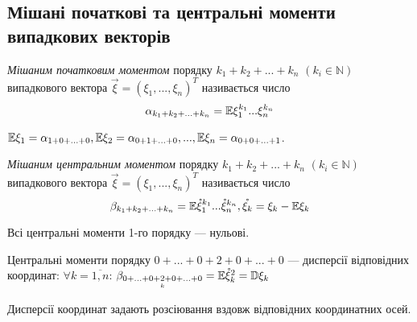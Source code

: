 \subsection{Мішані початкові та центральні 
            моменти випадкових векторів}
\begin{definition}
    \emph{Мішаним початковим моментом} порядку 
    $k_1+k_2+...+k_n$ 
    $\left(k_i \in \mathbb{N}\right)$
    випадкового вектора 
    $\vec{\xi} = \left(\xi_1, ..., \xi_n\right)^T$
    називається число
    \begin{equation*}
        \alpha_{k_1+k_2+...+k_n} = 
        \mathbb{E}{\xi_1^{k_1}...\xi_n^{k_n}}
    \end{equation*}
\end{definition}
\begin{remark}
    $\mathbb{E}\xi_1 = \alpha_{1+0+...+0}, \mathbb{E}\xi_2 = \alpha_{0+1+...+0},
    ..., \mathbb{E}\xi_n = \alpha_{0+0+...+1}$.
\end{remark}
\begin{definition}
    \emph{Мішаним центральним моментом} порядку 
    $k_1+k_2+...+k_n$
    $\left(k_i \in \mathbb{N}\right)$ 
    випадкового вектора
    $\vec{\xi} = \left(\xi_1, ..., \xi_n\right)^T$
    називається число
    \begin{equation*}
        \beta_{k_1+k_2+...+k_n} = 
        \mathbb{E}{\mathring{\xi}_1^{k_1}
        ...
        \mathring{\xi}_n^{k_n}},
        \mathring{\xi_k} = \xi_k - \mathbb{E}\xi_k
    \end{equation*}
\end{definition}
\begin{remark}
    Всі центральні моменти 1-го порядку --- 
    нульові.
\end{remark}
Центральні моменти порядку $0+...+0+2+0+...+0$ --- дисперсії відповідних координат:
    $\forall k = \overline{1,n}$: 
    $\beta_{0+...+0+\underset{k}{2}
    +0+...+0} = \mathbb{E}\mathring{\xi}_k^2 = 
    \mathbb{D}\xi_k$

Дисперсії координат задають розсіювання 
вздовж відповідних координатних осей.

